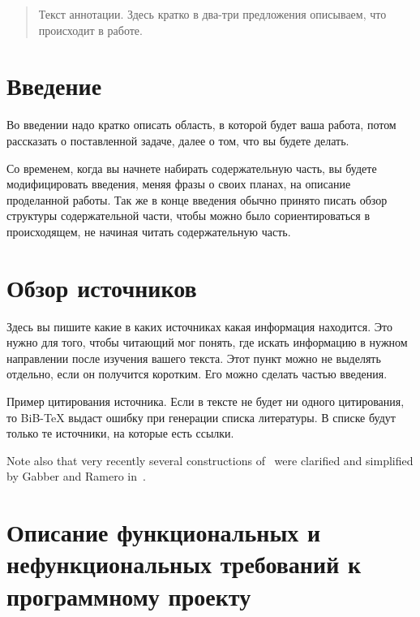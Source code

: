 \documentclass{article}
\begin{document}
\makeTitlePage

\tableofcontents

\begin{abstract}
Текст аннотации. Здесь кратко в два-три предложения описываем, что происходит в работе.
\end{abstract}


\section{Введение}

Во введении надо кратко описать область, в которой будет ваша работа, потом рассказать о поставленной задаче, далее о том, что вы будете делать.

Со временем, когда вы начнете набирать содержательную часть, вы будете модифицировать введения, меняя фразы о своих планах, на описание проделанной работы. Так же в конце введения обычно принято писать обзор структуры содержательной части, чтобы можно было сориентироваться в происходящем, не начиная читать содержательную часть.

\section{Обзор источников}

Здесь вы пишите какие в каких источниках какая информация находится. Это нужно для того, чтобы читающий мог понять, где искать информацию в нужном направлении после изучения вашего текста. Этот пункт можно не выделять отдельно, если он получится коротким. Его можно сделать частью введения.

Пример цитирования источника. Если в тексте не будет ни одного цитирования, то BiB-TeX выдаст ошибку при генерации списка литературы. В списке будут только те источники, на которые есть ссылки.

Note also that very recently several constructions of~\cite{Elkik73} were clarified and simplified by Gabber and Ramero in~\cite[Chapter~5]{GabRam}.

\section{Описание функциональных и нефункциональных требований к программному проекту}
\end{document}
